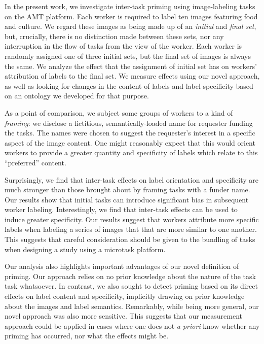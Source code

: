 \documentclass[letterpaper,twocolumn]{article}
\begin{document}
In the present work, we investigate inter-task priming using image-labeling 
tasks on the AMT platform.  
Each worker is required to label ten images 
featuring 
food and culture.  We regard these images as being made up of an 
\textit{initial} and \textit{final set}, but, crucially, there is no
distinction made between these sets, nor any interruption in the flow of tasks 
from the view of the worker.
Each worker is randomly assigned one of three initial sets, but the final set
of images is always the same.  We analyze the effect that the assignment of 
initial set has on workers' attribution of labels to the final set.  We 
measure effects using our novel approach, as well as looking for changes in 
the content of labels and label specificity based on an ontology we 
developed for that purpose.

As a point of comparison, we subject some groups of workers to a kind of
\textit{framing}: we disclose a fictitious, semantically-loaded name for 
requester funding the tasks.
The names were chosen to suggest the requester's interest in 
a specific aspect of the image content.  One might reasonably expect that this 
would orient workers to provide a greater quantity and specificity of labels 
which relate to this ``preferred'' content.

Surprisingly, we find that inter-task effects on label orientation and 
specificity are much stronger than those brought about by framing tasks with a 
funder name.  Our results show that initial tasks can introduce significant 
bias in subsequent worker labeling.  Interestingly, we find that inter-task
effects can be used to induce greater specificity.  Our results suggest that
workers attribute more specific labels when labeling a series of images that
that are more similar to one another.  This suggests that careful 
consideration should be given to the bundling of tasks when designing a study 
using a microtask platform.

Our analysis also highlights important advantages of our novel definition of 
priming.  Our approach relies on no prior knowledge about the nature
of the task task whatsoever.  In contrast, we also sought to detect priming
based on its direct effects on label content and specificity, implicitly
drawing on prior knowledge about the images and label semantics.
Remarkably, while being more general, our novel approach was also more 
sensitive.  This suggests that our measurement approach could be applied in 
cases where one does not \emph{a priori} know whether any priming has occurred, 
nor what the effects might be.
\end{document}
